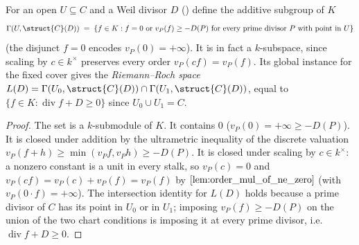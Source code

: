 \begin{definition}
  \label{def:adelic_sectionOfDivisor}
  For an open \(U \subseteq C\) and a Weil divisor \(D\)
  () define the additive subgroup of \(K\)
  \[
    \Gamma(U, \struct{C}(D)) \;=\;
      \{ f \in K : f = 0 \text{ or } v_P(f) \ge -D(P) \text{ for every
         prime divisor } P \text{ with point in } U\}
  \]
  (the disjunct \(f = 0\) encodes \(v_P(0) = +\infty\)). It is in fact a
  \(k\)-subspace, since scaling by \(c \in k^\times\) preserves every
  order \(v_P(cf) = v_P(f)\). Its global instance for the fixed cover
  gives the \emph{Riemann--Roch space}
  \(L(D) = \Gamma(U_0, \struct{C}(D)) \cap \Gamma(U_1, \struct{C}(D))\),
  equal to \(\{ f \in K : \operatorname{div} f + D \ge 0\}\) since
  \(U_0 \cup U_1 = C\).
\end{definition}
\begin{proof}
  The set is a \(k\)-submodule of \(K\). It contains \(0\)
  (\(v_P(0) = +\infty \ge -D(P)\)). It is closed under addition by the
  ultrametric inequality of the discrete valuation
  \(v_P(f + h) \ge \min(v_P f, v_P h) \ge -D(P)\). It is closed under
  scaling by \(c \in k^\times\): a nonzero constant is a unit in every
  stalk, so \(v_P(c) = 0\) and \(v_P(cf) = v_P(c) + v_P(f) = v_P(f)\) by
  \(\Cref{lem:order_mul_of_ne_zero}\) (with \(v_P(0\cdot f) = +\infty\)).
  The intersection identity for \(L(D)\) holds because a prime divisor of
  \(C\) has its point in \(U_0\) or in \(U_1\); imposing \(v_P(f) \ge
  -D(P)\) on the union of the two chart conditions is imposing it at
  every prime divisor, i.e.\ \(\operatorname{div} f + D \ge 0\).
\end{proof}

